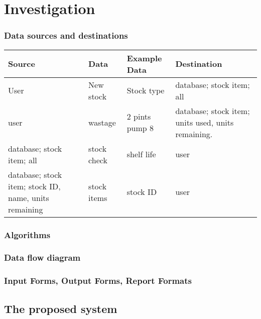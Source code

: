 \section{Investigation}


\subsubsection{Data sources and destinations}
\begin{center}
\begin{tabular}{|l|l|l|l|}
    \hline
    \textbf{Source} & \textbf{Data} & \textbf{Example Data} & \textbf{Destination} \\ \hline
	User & New stock & Stock type & database; stock item; all \\ \hline
	user & wastage & 2 pints pump 8 &database; stock item; units used, units remaining. \\ \hline
	database; stock item; all & stock check & shelf life & user \\ \hline
	database; stock item; stock ID, name, units remaining & stock items & stock ID & user \\ \hline
	
	
    
\end{tabular}
\label{tab:range_examples}
\end{center}

\subsubsection{Algorithms}

\subsubsection{Data flow diagram}

\subsubsection{Input Forms, Output Forms, Report Formats}

\subsection{The proposed system}


